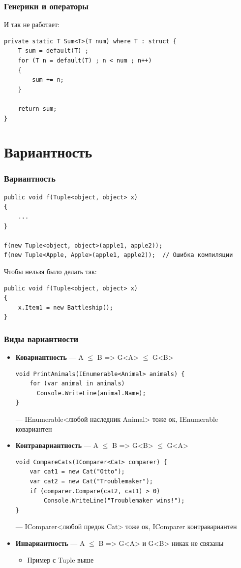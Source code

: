 \documentclass[xetex,mathserif,serif]{beamer}
\begin{document}
	\begin{frame}[fragile]
		\frametitle{Генерики и операторы}
		И так не работает:
		\begin{footnotesize}
			\begin{verbatim}
private static T Sum<T>(T num) where T : struct {
    T sum = default(T) ;
    for (T n = default(T) ; n < num ; n++)
    {
        sum += n;
    }

    return sum;
}
			\end{verbatim}
		\end{footnotesize}
	\end{frame}

	\section{Вариантность}

	\begin{frame}[fragile]
		\frametitle{Вариантность}
		\begin{verbatim}
public void f(Tuple<object, object> x)
{
    ...
}

f(new Tuple<object, object>(apple1, apple2));
f(new Tuple<Apple, Apple>(apple1, apple2));  // Ошибка компиляции
		\end{verbatim}
		\vspace{3mm}
		Чтобы нельзя было делать так:
		\begin{verbatim}
public void f(Tuple<object, object> x)
{
    x.Item1 = new Battleship();
}
		\end{verbatim}
	\end{frame}

		\begin{frame}[fragile]
		\frametitle{Виды вариантности}
		\begin{footnotesize}
			\begin{itemize}
				\item \textbf{Ковариантность} --- A $\leq$ B => G<A> $\leq$ G<B>
				\begin{verbatim}
void PrintAnimals(IEnumerable<Animal> animals) {
    for (var animal in animals)
      Console.WriteLine(animal.Name);
}
				\end{verbatim}
				--- IEnumerable<любой наследник Animal> тоже ок, IEnumerable ковариантен
				\item \textbf{Контравариантность} --- A $\leq$ B => G<B> $\leq$ G<A>
				\begin{verbatim}
void CompareCats(IComparer<Cat> comparer) {
    var cat1 = new Cat("Otto");
    var cat2 = new Cat("Troublemaker");
    if (comparer.Compare(cat2, cat1) > 0) 
        Console.WriteLine("Troublemaker wins!");
}
				\end{verbatim}
				--- IComparer<любой предок Cat> тоже ок, IComparer контравариантен
				\item \textbf{Инвариантность} --- A $\leq$ B => G<A> и G<B> никак не связаны
				\begin{itemize}
					\item Пример с Tuple выше
				\end{itemize}
			\end{itemize}
		\end{footnotesize}
	\end{frame}
\end{document}
